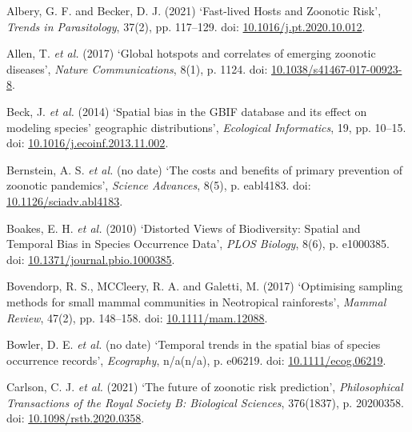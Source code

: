 \documentclass[
]{article}
\newlength{\cslhangindent}
\newlength{\cslentryspacingunit} %
\newenvironment{CSLReferences}[2] %
 {%
  \setlength{\parindent}{0pt}
  \ifodd #1
  \let\oldpar\par
  \def\par{\hangindent=\cslhangindent\oldpar}
  \fi
  \setlength{\parskip}{#2\cslentryspacingunit}
 }%
 {}
\begin{document}
\hypertarget{refs}{}
\begin{CSLReferences}{0}{0}
\leavevmode{}%
Albery, G. F. and Becker, D. J. (2021) {`Fast-lived {Hosts} and
{Zoonotic} {Risk}'}, \emph{Trends in Parasitology}, 37(2), pp. 117--129.
doi:
\href{https://doi.org/10.1016/j.pt.2020.10.012}{10.1016/j.pt.2020.10.012}.

\leavevmode{}%
Allen, T. \emph{et al.} (2017) {`Global hotspots and correlates of
emerging zoonotic diseases'}, \emph{Nature Communications}, 8(1), p.
1124. doi:
\href{https://doi.org/10.1038/s41467-017-00923-8}{10.1038/s41467-017-00923-8}.

\leavevmode{}%
Beck, J. \emph{et al.} (2014) {`Spatial bias in the {GBIF} database and
its effect on modeling species' geographic distributions'},
\emph{Ecological Informatics}, 19, pp. 10--15. doi:
\href{https://doi.org/10.1016/j.ecoinf.2013.11.002}{10.1016/j.ecoinf.2013.11.002}.

\leavevmode{}%
Bernstein, A. S. \emph{et al.} (no date) {`The costs and benefits of
primary prevention of zoonotic pandemics'}, \emph{Science Advances},
8(5), p. eabl4183. doi:
\href{https://doi.org/10.1126/sciadv.abl4183}{10.1126/sciadv.abl4183}.

\leavevmode{}%
Boakes, E. H. \emph{et al.} (2010) {`Distorted {Views} of
{Biodiversity}: {Spatial} and {Temporal} {Bias} in {Species}
{Occurrence} {Data}'}, \emph{PLOS Biology}, 8(6), p. e1000385. doi:
\href{https://doi.org/10.1371/journal.pbio.1000385}{10.1371/journal.pbio.1000385}.

\leavevmode{}%
Bovendorp, R. S., MCCleery, R. A. and Galetti, M. (2017) {`Optimising
sampling methods for small mammal communities in {Neotropical}
rainforests'}, \emph{Mammal Review}, 47(2), pp. 148--158. doi:
\href{https://doi.org/10.1111/mam.12088}{10.1111/mam.12088}.

\leavevmode{}%
Bowler, D. E. \emph{et al.} (no date) {`Temporal trends in the spatial
bias of species occurrence records'}, \emph{Ecography}, n/a(n/a), p.
e06219. doi:
\href{https://doi.org/10.1111/ecog.06219}{10.1111/ecog.06219}.

\leavevmode{}%
Carlson, C. J. \emph{et al.} (2021) {`The future of zoonotic risk
prediction'}, \emph{Philosophical Transactions of the Royal Society B:
Biological Sciences}, 376(1837), p. 20200358. doi:
\href{https://doi.org/10.1098/rstb.2020.0358}{10.1098/rstb.2020.0358}.


\end{CSLReferences}
\end{document}
